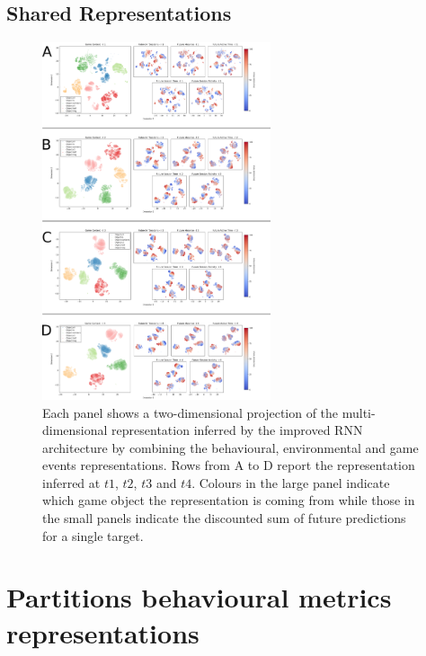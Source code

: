 \subsection{Shared Representations}
\begin{figure}[!htb]
\includegraphics[width=0.6\textwidth]{images/appendix_D/rnn_full_state_umap.png}
\centering
\caption[\textbf{Lower dimensional representation of the shared latent representations generated by the improved RNN architecture}]{Each panel shows a two-dimensional projection of the multi-dimensional representation inferred by the improved RNN architecture by combining the behavioural, environmental and game events representations. Rows from A to D report the representation inferred at $t1$, $t2$, $t3$ and $t4$. Colours in the large panel indicate which game object the representation is coming from while those in the small panels indicate the discounted sum of future predictions for a single target.}
\end{figure}
\FloatBarrier

\section{Partitions behavioural metrics representations}
\label{partitions_behavioural}

